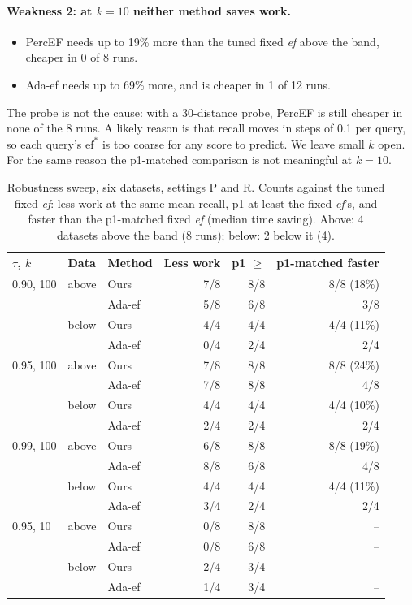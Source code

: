 \documentclass[sigconf, nonacm]{acmart}
\newcommand{\ef}{\textit{ef}}
\begin{document}
\paragraph{Weakness 2: at $k = 10$ neither method saves work.}
\begin{itemize}
\item PercEF needs up to 19\% more than the tuned fixed \ef{} above the band, cheaper in 0 of 8 runs.
\item Ada-ef needs up to 69\% more, and is cheaper in 1 of 12 runs.
\end{itemize}
The probe is not the cause: with a 30-distance probe, PercEF is still cheaper in none of the 8 runs.
A likely reason is that recall moves in steps of 0.1 per query, so each query's $\mathrm{ef}^*$ is
too coarse for any score to predict. We leave small $k$ open. For the same reason the p1-matched
comparison is not meaningful at $k = 10$.

\begin{table}[t]
  \caption{Robustness sweep, six datasets, settings P and R. Counts against the tuned fixed \ef{}:
  less work at the same mean recall, p1 at least the fixed \ef{}'s, and faster than the p1-matched
  fixed \ef{} (median time saving). Above: 4 datasets above the band (8 runs); below: 2 below it (4).}
  \label{tab:sweep}
  \centering\footnotesize\setlength{\tabcolsep}{3.5pt}
  \begin{tabular}{lllrrr}
    \toprule
    $\tau$, $k$ & Data & Method & Less work & p1 $\geq$ & p1-matched faster \\
    \midrule
    0.90, 100 & above & Ours   & 7/8 & 8/8 & 8/8 (18\%) \\
              &       & Ada-ef & 5/8 & 6/8 & 3/8 \\
              & below & Ours   & 4/4 & 4/4 & 4/4 (11\%) \\
              &       & Ada-ef & 0/4 & 2/4 & 2/4 \\
    \midrule
    0.95, 100 & above & Ours   & 7/8 & 8/8 & 8/8 (24\%) \\
              &       & Ada-ef & 7/8 & 8/8 & 4/8 \\
              & below & Ours   & 4/4 & 4/4 & 4/4 (10\%) \\
              &       & Ada-ef & 2/4 & 2/4 & 2/4 \\
    \midrule
    0.99, 100 & above & Ours   & 6/8 & 8/8 & 8/8 (19\%) \\
              &       & Ada-ef & 8/8 & 6/8 & 4/8 \\
              & below & Ours   & 4/4 & 4/4 & 4/4 (11\%) \\
              &       & Ada-ef & 3/4 & 2/4 & 2/4 \\
    \midrule
    0.95, 10  & above & Ours   & 0/8 & 8/8 & -- \\
              &       & Ada-ef & 0/8 & 6/8 & -- \\
              & below & Ours   & 2/4 & 3/4 & -- \\
              &       & Ada-ef & 1/4 & 3/4 & -- \\
    \bottomrule
  \end{tabular}
\end{table}
\end{document}
